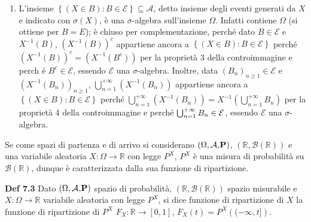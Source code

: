 \documentclass{article}
\begin{document}
\begin{enumerate}
\item L'insieme $\left\{ \left( X\in B\right) :B\in \mathcal{E}\right\}
\subseteq \mathcal{A}$, detto insieme degli eventi generati da $X$ e
indicato con $\sigma \left( X\right) $, \`{e} una $\sigma $-algebra
sull'insieme $\Omega $. Infatti contiene $\Omega $ (si ottiene per $B=E$); 
\`{e} chiuso per complementazione, perch\'{e} dato $B\in \mathcal{E}$ e $%
X^{-1}\left( B\right) $, $\left( X^{-1}\left( B\right) \right) ^{c}$
appartiene ancora a $\left\{ \left( X\in B\right) :B\in \mathcal{E}\right\} $
perch\'{e} $\left( X^{-1}\left( B\right) \right) ^{c}=\left( X^{-1}\left(
B^{c}\right) \right) $ per la propriet\`{a} 3 della controimmagine e perch%
\'{e} $B^{c}\in \mathcal{E}$, essendo $\mathcal{E}$ una $\sigma $-algebra.
Inoltre, data $\left( B_{n}\right) _{n\geq 1}\in \mathcal{E}$ e $\left(
X^{-1}\left( B_{n}\right) \right) _{n\geq 1}$, $\bigcup_{n=1}^{+\infty
}\left( X^{-1}\left( B_{n}\right) \right) $ appartiene ancora a $\left\{
\left( X\in B\right) :B\in \mathcal{E}\right\} $ perch\'{e} $%
\bigcup_{n=1}^{+\infty }\left( X^{-1}\left( B_{n}\right) \right)
=X^{-1}\left( \bigcup_{n=1}^{+\infty }B_{n}\right) $ per la propriet\`{a} 4
della controimmagine e perch\'{e} $\bigcup_{n=1}^{+\infty }B_{n}\in \mathcal{%
E}$, essendo $\mathcal{E}$ una $\sigma $-algebra.
\end{enumerate}

Se come spazi di partenza e di arrivo si considerano $\left( \Omega ,%
\mathcal{A}\emph{,}\mathbf{P}\right) $, $\left( 
\mathbb{R}
,\mathcal{B}\left( 
\mathbb{R}
\right) \right) $ e una variabile aleatoria $X:\Omega \rightarrow 
\mathbb{R}
$ con legge $P^{X}$, $P^{X}$ \`{e} una misura di probabilit\`{a} su $%
\mathcal{B}\left( 
\mathbb{R}
\right) $, dunque \`{e} caratterizzata dalla sua funzione di ripartizione.

\textbf{Def 7.3} Dato $\left( \Omega ,\mathcal{A}\emph{,}\mathbf{P}\right) $
spazio di probabilit\`{a}, $\left( 
\mathbb{R}
,\mathcal{B}\left( 
\mathbb{R}
\right) \right) $ spazio misurabile e $X:\Omega \rightarrow 
\mathbb{R}
$ variabile aleatoria con legge $P^{X}$, si dice funzione di ripartizione di 
$X$ la funzione di ripartizione di $P^{X}$ $F_{X}:%
\mathbb{R}
\rightarrow \left[ 0,1\right] $, $F_{X}\left( t\right) =P^{X}\left( (-\infty
,t]\right) $.
\end{document}
